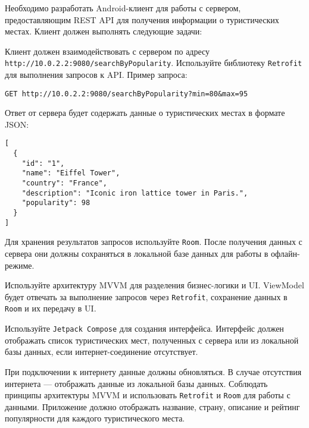 
Необходимо разработать Android-клиент для работы с сервером, предоставляющим REST API для получения информации о туристических местах. Клиент должен выполнять следующие задачи:

Клиент должен взаимодействовать с сервером по адресу \texttt{http://10.0.2.2:9080/searchByPopularity}. Используйте библиотеку \texttt{Retrofit} для выполнения запросов к API. Пример запроса:

\begin{verbatim}
GET http://10.0.2.2:9080/searchByPopularity?min=80&max=95
\end{verbatim}

Ответ от сервера будет содержать данные о туристических местах в формате JSON:

\begin{verbatim}
[
  {
    "id": "1",
    "name": "Eiffel Tower",
    "country": "France",
    "description": "Iconic iron lattice tower in Paris.",
    "popularity": 98
  }
]
\end{verbatim}

Для хранения результатов запросов используйте \texttt{Room}. После получения данных с сервера они должны сохраняться в локальной базе данных для работы в офлайн-режиме.

Используйте архитектуру MVVM для разделения бизнес-логики и UI. ViewModel будет отвечать за выполнение запросов через \texttt{Retrofit}, сохранение данных в \texttt{Room} и их передачу в UI.

Используйте \texttt{Jetpack Compose} для создания интерфейса. Интерфейс должен отображать список туристических мест, полученных с сервера или из локальной базы данных, если интернет-соединение отсутствует.

При подключении к интернету данные должны обновляться.
В случае отсутствия интернета — отображать данные из локальной базы данных.
Соблюдать принципы архитектуры MVVM и использовать \texttt{Retrofit} и \texttt{Room} для работы с данными.
Приложение должно отображать название, страну, описание и рейтинг популярности для каждого туристического места.
